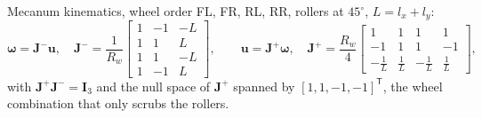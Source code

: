 \documentclass[11pt,a4paper]{article}
\newcommand{\vect}[1]{\bm{#1}}
\newcommand{\mat}[1]{\bm{#1}}
\newcommand{\T}{^{\mathsf{T}}}
\begin{document}
Mecanum kinematics, wheel order FL, FR, RL, RR, rollers at $45^\circ$, $L = l_x + l_y$:
\begin{equation}
\vect\omega = \mat J^{-}\vect u,\quad
\mat J^{-} = \frac{1}{R_w}\begin{bmatrix}1&-1&-L\\ 1&1&L\\ 1&1&-L\\ 1&-1&L\end{bmatrix},\qquad
\vect u = \mat J^{+}\vect\omega,\quad
\mat J^{+} = \frac{R_w}{4}\begin{bmatrix}1&1&1&1\\ -1&1&1&-1\\ -\tfrac1L&\tfrac1L&-\tfrac1L&\tfrac1L\end{bmatrix},
\end{equation}
with $\mat J^{+}\mat J^{-} = \mat I_3$ and the null space of $\mat J^{+}$ spanned by $[1,1,-1,-1]\T$, the wheel combination that only scrubs the rollers.
\end{document}
